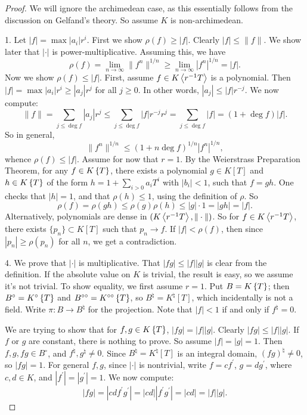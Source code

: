 \begin{proof}
We will ignore the archimedean case, as this essentially follows from the 
discussion on Gelfand's theory. So assume $K$ is non-archimedean.

1. Let $|f|=\max |a_i| r^i$. First we show $\rho(f) \geqslant |f|$. Clearly 
$|f|\leqslant \|f\|$. We show later that $|\cdot|$ is power-multiplicative. 
Assuming this, we have 
\[
  \rho(f) = \lim_{n\to \infty} \|f^n\|^{1/n} \geqslant \lim_{n\to \infty} |f^n|^{1/n} = |f| .
\]
Now we show $\rho(f) \leqslant |f|$. First, assume $f\in K\left\langle r^{-1} T \right\rangle$ is 
a polynomial. Then $|f| = \max |a_i|r^i \geqslant |a_j| r^j$ for all 
$j\geqslant 0$. In other words, $|a_j| \leqslant |f| r^{-j}$. We now compute: 
\[
	\|f\| = \sum_{j\leqslant \deg f} |a_j| r^j \leqslant \sum_{j\leqslant \deg f} |f| r^{-j} r^j = \sum_{j\leqslant \deg f} |f| = (1+\deg f)|f| .
\]
So in general, 
\[
	\|f^n\|^{1/n} \leqslant (1+n\deg f)^{1/n} |f^n|^{1/n} ,
\]
whence $\rho(f) \leqslant |f|$. Assume for now that $r=1$. By the 
Weierstrass Preparation Theorem, for any $f\in K\left\{ T \right\}$, there exists a 
polynomial $g\in K[T]$ and $h\in K\left\{ T \right\}$ of the form 
$h=1+\sum_{i>0} a_i T^i$ with $|b_i|<1$, such that $f = g h$. One checks 
that $|h|=1$, and that $\rho(h)\leqslant 1$, using the definition of $\rho$. 
So 
\[
	\rho(f) = \rho(g h) \leqslant \rho(g) \rho(h) \leqslant |g|\cdot 1 = |g h| = |f| . 
\]
Alternatively, polynomials are dense in $(K\left\langle r^{-1}T \right\rangle,\|\cdot\|)$. So 
for $f\in K\left\langle r^{-1} T \right\rangle$, there exists $\{p_n\}\subset K[T]$ such that 
$p_n\to f$. If $|f|<\rho(f)$, then since $|p_n|\geqslant \rho(p_n)$ for all 
$n$, we get a contradiction. 

4. We prove that $|\cdot|$ is multiplicative. 
That $|f g| \leqslant |f| |g|$ is clear from the definition. If the absolute 
value on $K$ is trivial, the result is easy, so we assume it's not trivial. To 
show equality, we first assume $r=1$. Put $B=K\left\{ T \right\}$; then 
$B^\circ = K^\circ\left\{ T \right\}$ and $B^{\circ\circ}=K^{\circ\circ}\left\{ T \right\}$, so 
$B^\natural = K^\natural[T]$, which incidentally is not a field. Write 
$\pi\colon B\to B^\natural$ for the projection. Note that $|f|<1$ if and only 
if $f^\natural=0$. 

We are trying to show that for $f,g\in K\left\{ T \right\}$, $|fg|=|f||g|$. Clearly 
$|f g|\leqslant |f| |g|$. If $f$ or $g$ are constant, there is nothing to 
prove. So assume $|f|=|g|=1$. Then $f,g,f g\in B^\circ$, and 
$f^\natural,g^\natural\ne 0$. Since $B^\natural=K^\natural[T]$ is an integral 
domain, $(f g)^\natural\ne 0$, so $|f g|=1$. For general $f,g$, since $|\cdot|$ 
is nontrivial, write $f=c f^\prime$, $g=d g^\prime$, where 
$c,d\in K$, and $|f^\prime|=|g^\prime|=1$. We now compute: 
\[
	|f g| = |cdf^\prime g^\prime| = |c d| |f^\prime g^\prime| = |c d| = |f| |g| .
\]


\end{proof}
